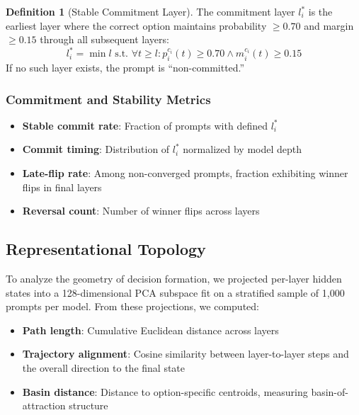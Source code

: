 \documentclass[11pt]{article}
\theoremstyle{definition}
\newtheorem{definition}{Definition}[section]
\begin{document}
\begin{definition}[Stable Commitment Layer]
The commitment layer $l_i^*$ is the earliest layer where the correct option maintains probability $\geq 0.70$ and margin $\geq 0.15$ through all subsequent layers:
\begin{equation}
l_i^* = \min l \text{ s.t. } \forall t \geq l: p_i^{c_i}(t) \geq 0.70 \land m_i^{c_i}(t) \geq 0.15
\end{equation}
If no such layer exists, the prompt is ``non-committed.''
\end{definition}

\subsubsection{Commitment and Stability Metrics}

\begin{itemize}
    \item \textbf{Stable commit rate}: Fraction of prompts with defined $l_i^*$
    \item \textbf{Commit timing}: Distribution of $l_i^*$ normalized by model depth
    \item \textbf{Late-flip rate}: Among non-converged prompts, fraction exhibiting winner flips in final layers
    \item \textbf{Reversal count}: Number of winner flips across layers
\end{itemize}

\subsection{Representational Topology}

To analyze the geometry of decision formation, we projected per-layer hidden states into a 128-dimensional PCA subspace fit on a stratified sample of 1,000 prompts per model. From these projections, we computed:

\begin{itemize}
    \item \textbf{Path length}: Cumulative Euclidean distance across layers
    \item \textbf{Trajectory alignment}: Cosine similarity between layer-to-layer steps and the overall direction to the final state
    \item \textbf{Basin distance}: Distance to option-specific centroids, measuring basin-of-attraction structure
\end{itemize}
\end{document}
